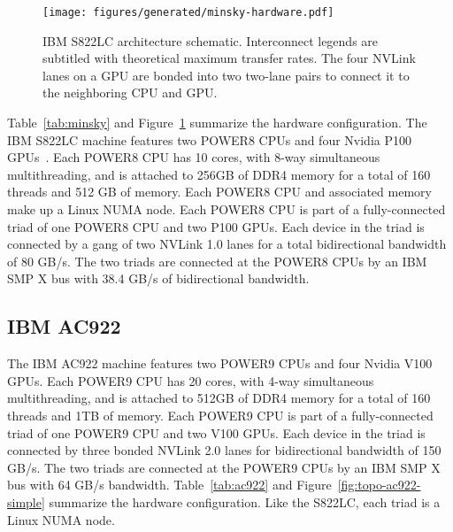 \begin{figure}[ht]
    \centering
	\texttt{[image: figures/generated/minsky-hardware.pdf]}
    \caption[IBM S822LC architecture schematic]{
		IBM S822LC architecture schematic.
		Interconnect legends are subtitled with theoretical maximum transfer rates.
		The four NVLink lanes on a GPU are bonded into two two-lane pairs to connect it to the neighboring CPU and GPU.
	}
    \label{fig:topo-minsky-simple}
\end{figure}

Table~\ref{tab:minsky} and Figure~\ref{fig:topo-minsky-simple} summarize the hardware configuration.
The IBM S822LC machine features two POWER8 CPUs and four Nvidia P100 GPUs~\cite{caldeira2016s822lc}.
Each POWER8 CPU has 10 cores, with 8-way simultaneous multithreading, and is attached to 256GB of DDR4 memory for a total of 160 threads and 512 GB of memory.
Each POWER8 CPU and associated memory make up a Linux NUMA node.
Each POWER8 CPU is part of a fully-connected triad of one POWER8 CPU and two P100 GPUs.
Each device in the triad is connected by a gang of two NVLink 1.0 lanes for a total bidirectional bandwidth of 80 GB/s.
The two triads are connected at the POWER8 CPUs by an IBM SMP X bus with 38.4 GB/s of bidirectional bandwidth.

\subsection{IBM AC922}
\label{sec:ac922}

The IBM AC922 machine features two POWER9 CPUs and four Nvidia V100 GPUs\cite{caldeira2018ac922}.
Each POWER9 CPU has 20 cores, with 4-way simultaneous multithreading, and is attached to 512GB of DDR4 memory for a total of 160 threads and 1TB of memory.
Each POWER9 CPU is part of a fully-connected triad of one POWER9 CPU and two V100 GPUs.
Each device in the triad is connected by three bonded NVLink 2.0 lanes for bidirectional bandwidth of 150 GB/s.
The two triads are connected at the POWER9 CPUs by an IBM SMP X bus with 64 GB/s bandwidth.
Table~\ref{tab:ac922} and Figure~\ref{fig:topo-ac922-simple} summarize the hardware configuration.
Like the S822LC, each triad is a Linux NUMA node.

